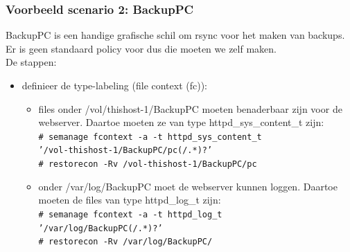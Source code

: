 \begin{frame}
    \frametitle{Voorbeeld scenario 2: BackupPC}
BackupPC is een handige grafische schil om rsync voor het maken van backups. \\
Er is geen standaard policy voor dus die moeten we zelf maken. \\
\pause
De stappen:
\footnotesize
\begin{itemize}
\item definieer de type-labeling (file context (fc)):
	\footnotesize
	\begin{itemize}
	\footnotesize
	\item files onder /vol/thishost-1/BackupPC moeten benaderbaar zijn voor de webserver. Daartoe moeten ze van type
httpd\_sys\_content\_t zijn: \\
	\footnotesize
{\tt \# semanage fcontext -a -t httpd\_sys\_content\_t  \\
\hspace{7pt} '/vol-thishost-1/BackupPC/pc(/.*)?' \\
\# restorecon -Rv /vol-thishost-1/BackupPC/pc} \\
	\footnotesize
	\pause
	\item onder /var/log/BackupPC moet de webserver kunnen loggen. Daartoe moeten de files van type httpd\_log\_t zijn: \\
	\footnotesize
{\tt \# semanage fcontext -a -t httpd\_log\_t \\
\hspace{7pt} '/var/log/BackupPC(/.*)?' \\
\# restorecon -Rv /var/log/BackupPC/}
	\end{itemize}
\end{itemize}
\end{frame}

